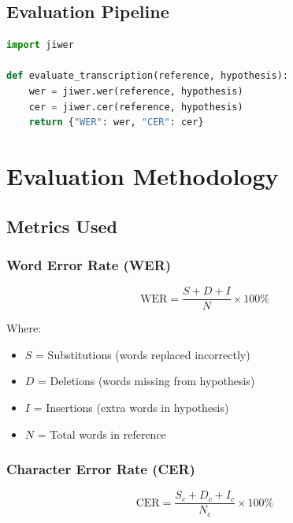 \documentclass[12pt,a4paper]{article}
\begin{document}
\subsection{Evaluation Pipeline}

\begin{lstlisting}[language=Python, caption=WER/CER Evaluation]
import jiwer

def evaluate_transcription(reference, hypothesis):
    wer = jiwer.wer(reference, hypothesis)
    cer = jiwer.cer(reference, hypothesis)
    return {"WER": wer, "CER": cer}
\end{lstlisting}

\section{Evaluation Methodology}

\subsection{Metrics Used}

\subsubsection{Word Error Rate (WER)}

\begin{equation}
\text{WER} = \frac{S + D + I}{N} \times 100\%
\end{equation}

Where:
\begin{itemize}[leftmargin=*]
\item $S$ = Substitutions (words replaced incorrectly)
\item $D$ = Deletions (words missing from hypothesis)
\item $I$ = Insertions (extra words in hypothesis)
\item $N$ = Total words in reference
\end{itemize}

\subsubsection{Character Error Rate (CER)}

\begin{equation}
\text{CER} = \frac{S_c + D_c + I_c}{N_c} \times 100\%
\end{equation}
\end{document}
